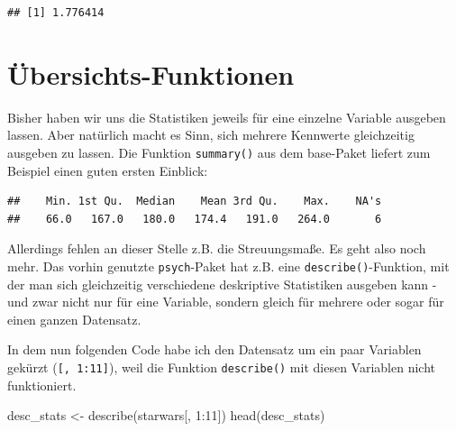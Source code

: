 \documentclass[
]{book}
\newenvironment{Shaded}{\begin{snugshade}}{\end{snugshade}}
\newcommand{\DecValTok}[1]{\textcolor[rgb]{0.00,0.00,0.81}{#1}}
\newcommand{\FunctionTok}[1]{\textcolor[rgb]{0.00,0.00,0.00}{#1}}
\newcommand{\NormalTok}[1]{#1}
\newcommand{\OtherTok}[1]{\textcolor[rgb]{0.56,0.35,0.01}{#1}}
\newcommand{\SpecialCharTok}[1]{\textcolor[rgb]{0.00,0.00,0.00}{#1}}
\begin{document}
\begin{verbatim}
## [1] 1.776414
\end{verbatim}

\hypertarget{uxfcbersichts-funktionen}{%
\section{Übersichts-Funktionen}\label{uxfcbersichts-funktionen}}

Bisher haben wir uns die Statistiken jeweils für eine einzelne Variable ausgeben lassen. Aber natürlich macht es Sinn, sich mehrere Kennwerte gleichzeitig ausgeben zu lassen. Die Funktion \texttt{summary()} aus dem base-Paket liefert zum Beispiel einen guten ersten Einblick:

\begin{Shaded}
\end{Shaded}

\begin{verbatim}
##    Min. 1st Qu.  Median    Mean 3rd Qu.    Max.    NA's 
##    66.0   167.0   180.0   174.4   191.0   264.0       6
\end{verbatim}

Allerdings fehlen an dieser Stelle z.B. die Streuungsmaße. Es geht also noch mehr. Das vorhin genutzte \texttt{psych}-Paket hat z.B. eine \texttt{describe()}-Funktion, mit der man sich gleichzeitig verschiedene deskriptive Statistiken ausgeben kann - und zwar nicht nur für eine Variable, sondern gleich für mehrere oder sogar für einen ganzen Datensatz.

In dem nun folgenden Code habe ich den Datensatz um ein paar Variablen gekürzt (\texttt{{[},\ 1:11{]}}), weil die Funktion \texttt{describe()} mit diesen Variablen nicht funktioniert.

\begin{Shaded}
\begin{Highlighting}[]
\NormalTok{desc\_stats }\OtherTok{\textless{}{-}} \FunctionTok{describe}\NormalTok{(starwars[, }\DecValTok{1}\SpecialCharTok{:}\DecValTok{11}\NormalTok{])}
\FunctionTok{head}\NormalTok{(desc\_stats)}
\end{Highlighting}
\end{Shaded}
\end{document}
